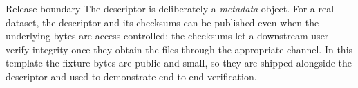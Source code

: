 \documentclass[
  ignorenonframetext,
]{beamer}
\begin{document}
\begin{frame}[allowframebreaks]{Release boundary}
\protect{}\label{release-boundary}
The descriptor is deliberately a \emph{metadata} object. For a real
dataset, the descriptor and its checksums can be published even when the
underlying bytes are access-controlled: the checksums let a downstream
user verify integrity once they obtain the files through the appropriate
channel. In this template the fixture bytes are public and small, so
they are shipped alongside the descriptor and used to demonstrate
end-to-end verification.
\end{frame}
\end{document}
